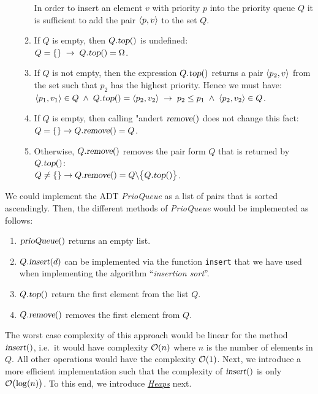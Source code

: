 \begin{Definition}
\begin{enumerate}
\begin{enumerate}
            In order to insert an  element $v$ with priority $p$ into the priority queue 
            $Q$ it is sufficient to add the pair $\pair(p,v)$ to the set $Q$.
      \item If  $Q$ is empty, then $Q.\textsl{top}()$ is undefined: \\[0.1cm]
            \hspace*{1.3cm} $Q = \{\} \;\rightarrow\; Q.\textsl{top}() = \Omega$.
     \item If $Q$ is not empty, then the expression $Q.\textsl{top}()$ returns a pair $\pair(p_2,v)$
           from the set such that $p_2$ has the highest priority.  Hence we must have:
              \\[0.1cm]
              \hspace*{1.3cm} 
              $\pair(p_1,v_1) \in Q \;\wedge\; Q.\textsl{top}() = \pair(p_2,v_2)
              \;\rightarrow\; p_2 \leq p_1 \;\wedge\; \pair(p_2,v_2) \in Q$.
      \item If  $Q$ is empty, then calling "andert $\textsl{remove}()$ does not change this fact: \\[0.1cm]
            \hspace*{1.3cm} $Q = \{\} \rightarrow Q.\textsl{remove}() = Q$.
      \item Otherwise,  $Q.\textsl{remove}()$ removes the pair form $Q$ that is returned by $Q.\textsl{top}()$: \\[0.1cm]
            \hspace*{1.3cm} 
            $Q \not= \{\} \rightarrow Q.\textsl{remove}() = Q \backslash \bigl\{ Q.\textsl{top}() \bigr\}$.
      \end{enumerate}
\end{enumerate}
\end{Definition}
We could implement the ADT \textsl{PrioQueue} as a list of pairs that is sorted ascendingly.
Then, the different methods of \textsl{PrioQueue} would be implemented as follows:
\begin{enumerate}
\item $\textsl{prioQueue}()$ returns an empty list.
\item $Q.\textsl{insert}(d)$ can be implemented via the function  \texttt{insert} that we have
      used when implementing the algorithm ``\emph{insertion sort}''.
\item $Q.\textsl{top}()$ return the first element from the list $Q$.
\item $Q.\textsl{remove}()$ removes the first element from $Q$.
\end{enumerate}
The worst case complexity of this approach would be linear for the method $\textsl{insert}()$,
i.e.~it would have complexity $\mathcal{O}(n)$ where $n$ is the number of elements in $Q$. 
All other operations would have the complexity $\mathcal{O}(1)$.  
Next, we introduce a more efficient implementation such that the complexity of $\textsl{insert}()$ 
is only $\mathcal{O}\bigl(\log(n)\bigr)$.  To this end, we introduce
\href{https://en.wikipedia.org/wiki/Heap_(data_structure)}{\emph{Heaps}} next. 

